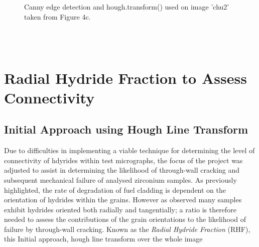 \documentclass{article}
\begin{document}
	\begin{figure}[h]
		\centering
		\hfill
		\caption{Canny edge detection and hough.transform() used on image 'chu2' taken from Figure 4c. }
		\label{Skeletonise2}
	\end{figure}
	\\
\pagebreak
\\
\section{Radial Hydride Fraction to Assess Connectivity}
\subsection{Initial Approach using Hough Line Transform}


Due to difficulties in implementing a viable technique for determining the level of connectivity of hdyrides within test micrographs, the focus of the project was adjusted to assist in determining the likelihood of through-wall cracking and subsequent mechanical failure of analysed zirconium samples. As previously highlighted, the rate of degradation of fuel cladding is dependent on the orientation of hydrides within the grains. However as observed many samples exhibit hydrides oriented both radially and tangentially; a ratio is therefore needed to assess the contributions of the grain orientations to the likelihood of failure by through-wall cracking. Known as the \textit{Radial Hydride Fraction} (RHF), this
Initial approach, hough line transform over the whole image
\end{document}
